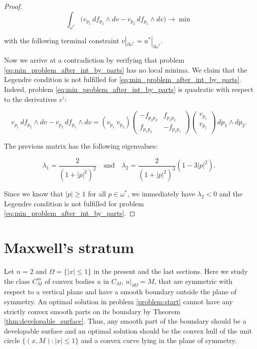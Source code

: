 \documentclass[14pt]{extarticle}
\renewcommand{\le}{\leqslant}
\renewcommand{\ge}{\geqslant}
\theoremstyle{remark}
\theoremstyle{definition}
\begin{document}
\begin{proof}
\begin{equation}
\label{eq:min_problem_after_int_by_parts}
	\int_{\omega^*} \big(
		v_{p_1}\,df_{p_2}\wedge dv - v_{p_2}\,df_{p_1}\wedge dv
	\big) \to\min
\end{equation}

\noindent with the following terminal constraint $v|_{\partial\omega^*} = u^*|_{\partial\omega^*}$.

Now we arrive at a contradiction by verifying that problem \eqref{eq:min_problem_after_int_by_parts} has no local minima. We claim that the Legendre condition is not fulfilled for \eqref{eq:min_problem_after_int_by_parts}. Indeed, problem \eqref{eq:min_problem_after_int_by_parts} is quadratic with respect to the derivatives $v'$:

\[
	v_{p_1}\,df_{p_2}\wedge dv - v_{p_2}\,df_{p_1}\wedge dv = 
	(v_{p_1}\ v_{p_2})
	\left(\begin{array}{rr}
		-f_{p_2p_2} &  f_{p_1p_2}\\
		 f_{p_1p_2} & -f_{p_1p_1}
	\end{array}\right)
	\left(\begin{array}{c}
		v_{p_1}\\
		v_{p_1}\\
	\end{array}\right)\,dp_1\wedge dp_2.
\]

\noindent The previous matrix has the following eigenvalues:

\[
	\lambda_1 = \frac{2}{(1+|p|^2)^2}
	\quad\mbox{and}\quad
	\lambda_2 = \frac{2}{(1+|p|^2)^3} (1-3|p|^2).
\]

\noindent Since we know that $|p|\ge1$ for all $p\in\omega^*$, we immediately have $\lambda_2<0$ and the Legendre condition is not fulfilled for problem \eqref{eq:min_problem_after_int_by_parts}.

\end{proof}

\section{Maxwell's stratum}
\label{sec:maxwell}

Let $n=2$ and $\Omega=\{|x|\le1\}$ in the present and the last sections. Here we study the class $C_M^m$ of convex bodies $u$ in $C_M$, $u|_{\partial\Omega}=M$, that are symmetric with respect to a vertical plane and have a smooth boundary outside the plane of symmetry. An optimal solution in problem \eqref{problem:start} cannot have any strictly convex smooth parts on its boundary by Theorem \ref{thm:developable_surface}. Thus, any smooth part of the boundary should be a developable surface and an optimal solution should be the convex hull of the unit circle $\{(x,M):|x|\le 1\}$ and a convex curve lying in the plane of symmetry.
\end{document}
